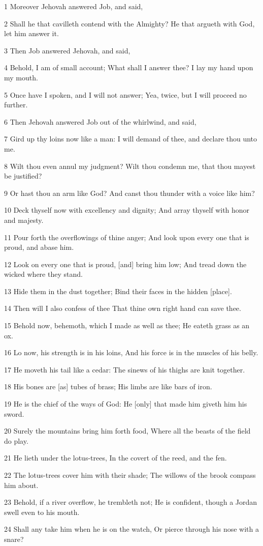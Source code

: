 \par 1 Moreover Jehovah answered Job, and said,
\par 2 Shall he that cavilleth contend with the Almighty? He that argueth with God, let him answer it.
\par 3 Then Job answered Jehovah, and said,
\par 4 Behold, I am of small account; What shall I answer thee? I lay my hand upon my mouth.
\par 5 Once have I spoken, and I will not answer; Yea, twice, but I will proceed no further.
\par 6 Then Jehovah answered Job out of the whirlwind, and said,
\par 7 Gird up thy loins now like a man: I will demand of thee, and declare thou unto me.
\par 8 Wilt thou even annul my judgment? Wilt thou condemn me, that thou mayest be justified?
\par 9 Or hast thou an arm like God? And canst thou thunder with a voice like him?
\par 10 Deck thyself now with excellency and dignity; And array thyself with honor and majesty.
\par 11 Pour forth the overflowings of thine anger; And look upon every one that is proud, and abase him.
\par 12 Look on every one that is proud, [and] bring him low; And tread down the wicked where they stand.
\par 13 Hide them in the dust together; Bind their faces in the hidden [place].
\par 14 Then will I also confess of thee That thine own right hand can save thee.
\par 15 Behold now, behemoth, which I made as well as thee; He eateth grass as an ox.
\par 16 Lo now, his strength is in his loins, And his force is in the muscles of his belly.
\par 17 He moveth his tail like a cedar: The sinews of his thighs are knit together.
\par 18 His bones are [as] tubes of brass; His limbs are like bars of iron.
\par 19 He is the chief of the ways of God: He [only] that made him giveth him his sword.
\par 20 Surely the mountains bring him forth food, Where all the beasts of the field do play.
\par 21 He lieth under the lotus-trees, In the covert of the reed, and the fen.
\par 22 The lotus-trees cover him with their shade; The willows of the brook compass him about.
\par 23 Behold, if a river overflow, he trembleth not; He is confident, though a Jordan swell even to his mouth.
\par 24 Shall any take him when he is on the watch, Or pierce through his nose with a snare?


